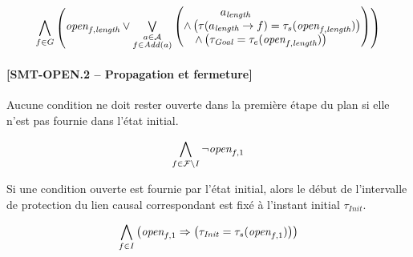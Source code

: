 \begin{small}
\[
\Bigforall{\substack{\f\in \G}}\begin{pmatrix}\open{\f}{\length} %
\vee \Bigexists{\substack{\a\in \A\\\f \in \add{\a}}}\begin{pmatrix}\a_{\length}\hfill\\
 \wedge \left(\tau(\a_{\length}\rightarrow \f) = \tau_{s}(\open{\f}{\length})\right)\hfill\\
  \wedge \left(\tau_{\mathit{Goal}} = \tau_{e}(\open{\f}{\length})\right)\hfill\end{pmatrix}\end{pmatrix}\hfill\\[-2em]
%
\]
\end{small}


\paragraph*{[SMT-OPEN.2 -- Propagation et fermeture]}

Aucune condition ne doit rester ouverte dans la première étape du plan si elle n'est pas fournie dans l'état initial.

\begin{small}
\[
\Bigforall{\substack{\f\in \F\setminus \I}}\neg \open{\f}{1}%
\]
\end{small}

Si une condition ouverte est fournie par l'état initial, alors le début de l'intervalle de protection du lien causal correspondant est fixé à l'instant initial $\tau_{\textit{Init}}$.

\begin{small}
\[
\Bigforall{\substack{\f\in \I}}\left(\open{\f}{1} \Rightarrow \left(\tau_{\mathit{Init}} = \tau_{s}(\open{\f}{1})\right)\right)%
\]
\end{small}

